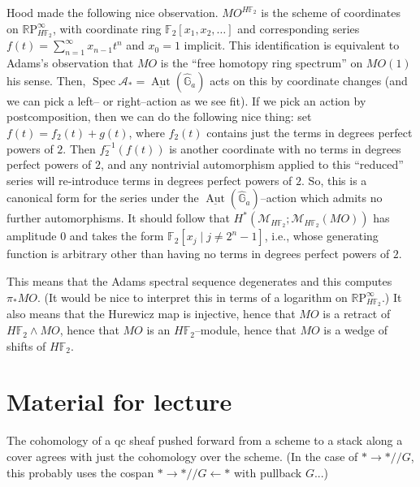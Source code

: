 \documentclass{amsart}
\newcommand{\F}{\mathbb F}
\newcommand{\G}{\mathbb G}
\newcommand{\R}{\mathbb R}
\newcommand{\RP}{\R\mathrm P}
\newcommand{\<}{\langle}
\renewcommand{\>}{\rangle}
\newcommand{\sm}{\wedge}
\newcommand{\mmod}{/\!\!/}
\newcommand{\context}[1]{\mathcal{M}_{#1}}
\DeclareMathOperator{\Spec}{Spec}
\numberwithin{equation}{section}
\theoremstyle{plain}
\theoremstyle{definition}
\theoremstyle{remark}
\begin{document}
Hood made the following nice observation. $MO^{H\F_2}$ is the scheme of coordinates on $\RP^\infty_{H\F_2}$, with coordinate ring $\F_2[x_1, x_2, \ldots]$ and corresponding series $f(t) = \sum_{n=1}^\infty x_{n-1} t^n$ and $x_0 = 1$ implicit. This identification is equivalent to Adams's observation that $MO$ is the ``free homotopy ring spectrum'' on $MO(1)$ his sense. Then, $\Spec \mathcal{A}_* = \underline{\operatorname{Aut}}(\widehat{\G}_a)$ acts on this by coordinate changes (and we can pick a left-- or right--action as we see fit). If we pick an action by postcomposition, then we can do the following nice thing: set $f(t) = f_2(t) + g(t)$, where $f_2(t)$ contains just the terms in degrees perfect powers of $2$. Then $f_2^{-1}(f(t))$ is another coordinate with no terms in degrees perfect powers of $2$, and any nontrivial automorphism applied to this ``reduced'' series will re-introduce terms in degrees perfect powers of $2$.  So, this is a canonical form for the series under the $\underline{\operatorname{Aut}}(\widehat{\mathbb G}_a)$--action which admits no further automorphisms. It should follow that $H^*(\context{H\F_2}; \context{H\F_2}(MO))$ has amplitude $0$ and takes the form $\F_2[x_j \mid j \ne 2^n - 1]$, i.e., whose generating function is arbitrary other than having no terms in degrees perfect powers of $2$.

This means that the Adams spectral sequence degenerates and this computes $\pi_* MO$.  (It would be nice to interpret this in terms of a logarithm on $\RP^\infty_{H\F_2}$.)  It also means that the Hurewicz map is injective, hence that $MO$ is a retract of $H\F_2 \sm MO$, hence that $MO$ is an $H\F_2$--module, hence that $MO$ is a wedge of shifts of $H\F_2$.










\section{Material for lecture}








The cohomology of a qc sheaf pushed forward from a scheme to a stack along a cover agrees with just the cohomology over the scheme. (In the case of $* \to * \mmod G$, this probably uses the cospan $* \to * \mmod G \leftarrow *$ with pullback $G$...)
\end{document}
